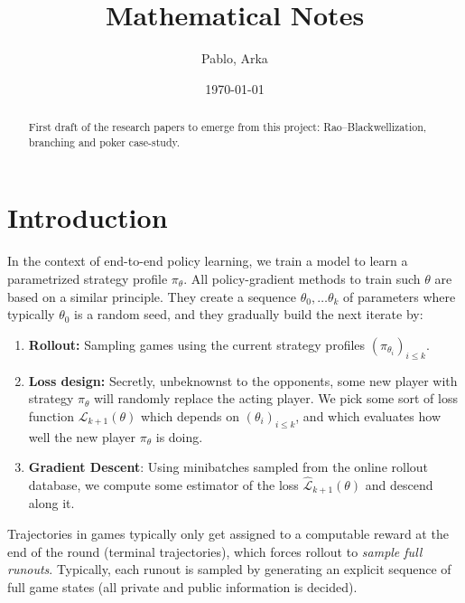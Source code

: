 \documentclass[12pt, a4paper]{article}
\title{Mathematical Notes}
\author{Pablo, Arka}
\date{\today}
\begin{document}
\maketitle

\begin{abstract}
First draft of the research papers to emerge from this project: Rao--Blackwellization, branching and poker case-study.
\end{abstract}

\tableofcontents
\newpage

\section{Introduction}\label{sec:intro}

In the context of end-to-end policy learning, we train a model to learn a parametrized strategy profile $\pi_\theta$.
All policy-gradient methods to train such  $\theta$ are based on a similar principle.
They create a sequence $\theta_0, \ldots \theta_k$ of parameters where typically $\theta_0$ is a random seed, and they gradually build the next iterate by:  
\begin{enumerate}[label =(\roman*)]
  \item \textbf{Rollout:} Sampling games using the current strategy profiles $(\pi_{\theta_i})_{i\le k}$.
  \item \textbf{Loss design:} Secretly, unbeknownst to the opponents, some new player with strategy $\pi_\theta$ will randomly replace the acting player.
  We pick some sort of loss function $\mathcal{L}_{k+1}(\theta)$ which depends on $(\theta_i)_{i\le k}$, and which evaluates how well the new player $\pi_\theta$ is doing.
  \item \textbf{Gradient Descent}: Using minibatches sampled from the online rollout database, we compute some estimator of the loss $\widehat{\mathcal{L}}_{k+1}(\theta)$ and descend along it.
\end{enumerate}

Trajectories in games typically only get assigned to a computable reward at the end of the round (terminal trajectories), which forces rollout to \textit{sample full runouts}.
Typically, each runout is sampled by generating an explicit sequence of full game states (all private and public information is decided).
\end{document}
